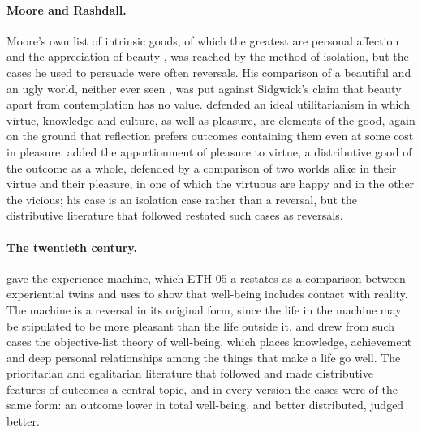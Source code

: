 \documentclass{situationist-preprint}
\begin{document}
\paragraph{Moore and Rashdall.} Moore's own list of intrinsic goods, of which the greatest are personal affection and the appreciation of beauty \citep[\S113]{Moore1903}, was reached by the method of isolation, but the cases he used to persuade were often reversals. His comparison of a beautiful and an ugly world, neither ever seen \citep[\S50]{Moore1903}, was put against Sidgwick's claim that beauty apart from contemplation has no value. \citet{Rashdall1907} defended an ideal utilitarianism in which virtue, knowledge and culture, as well as pleasure, are elements of the good, again on the ground that reflection prefers outcomes containing them even at some cost in pleasure. \citet{Ross1930} added the apportionment of pleasure to virtue, a distributive good of the outcome as a whole, defended by a comparison of two worlds alike in their virtue and their pleasure, in one of which the virtuous are happy and in the other the vicious; his case is an isolation case rather than a reversal, but the distributive literature that followed restated such cases as reversals.

\paragraph{The twentieth century.} \citet[pp.~42--45]{Nozick1974} gave the experience machine, which ETH-05-a restates as a comparison between experiential twins and uses to show that well-being includes contact with reality. The machine is a reversal in its original form, since the life in the machine may be stipulated to be more pleasant than the life outside it. \citet{Griffin1986} and \citet{Parfit1984} drew from such cases the objective-list theory of well-being, which places knowledge, achievement and deep personal relationships among the things that make a life go well. The prioritarian and egalitarian literature that followed \citet{Diamond1967} and \citet{Parfit1997} made distributive features of outcomes a central topic, and in every version the cases were of the same form: an outcome lower in total well-being, and better distributed, judged better.
\end{document}
